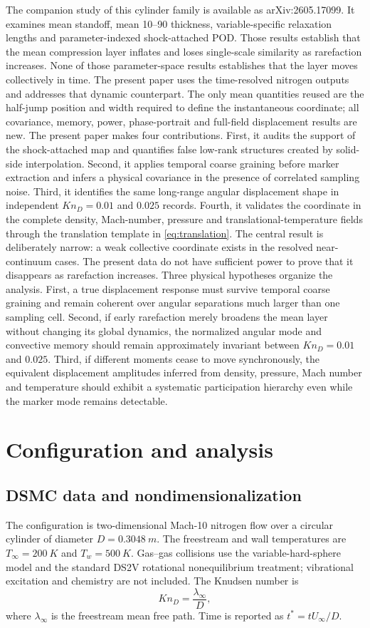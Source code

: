 \documentclass[paper]{JFM-FLM_Au}
\newcommand{\KnD}{Kn_D}
\newcommand{\tstar}{t^*}
\begin{document}
The companion study of this cylinder family \citep{RoohiShoja2026Mean} is available as arXiv:2605.17099. It examines mean standoff, mean 10--90 thickness, variable-specific relaxation lengths and parameter-indexed shock-attached POD. Those results establish that the mean compression layer inflates and loses single-scale similarity as rarefaction increases. None of those parameter-space results establishes that the layer moves collectively in time. The present paper uses the time-resolved nitrogen outputs and addresses that dynamic counterpart. The only mean quantities reused are the half-jump position and width required to define the instantaneous coordinate; all covariance, memory, power, phase-portrait and full-field displacement results are new. The present paper makes four contributions. First, it audits the support of the shock-attached map and quantifies false low-rank structures created by solid-side interpolation. Second, it applies temporal coarse graining before marker extraction and infers a physical covariance in the presence of correlated sampling noise. Third, it identifies the same long-range angular displacement shape in independent $\KnD=0.01$ and $0.025$ records. Fourth, it validates the coordinate in the complete density, Mach-number, pressure and translational-temperature fields through the translation template in \cref{eq:translation}. The central result is deliberately narrow: a weak collective coordinate exists in the resolved near-continuum cases. The present data do not have sufficient power to prove that it disappears as rarefaction increases. Three physical hypotheses organize the analysis. First, a true displacement response must survive temporal coarse graining and remain coherent over angular separations much larger than one sampling cell. Second, if early rarefaction merely broadens the mean layer without changing its global dynamics, the normalized angular mode and convective memory should remain approximately invariant between $\KnD=0.01$ and $0.025$. Third, if different moments cease to move synchronously, the equivalent displacement amplitudes inferred from density, pressure, Mach number and temperature should exhibit a systematic participation hierarchy even while the marker mode remains detectable.

\section{Configuration and analysis}
\subsection{DSMC data and nondimensionalization}
The configuration is two-dimensional Mach-10 nitrogen flow over a circular cylinder of diameter $D=\SI{0.3048}{m}$. The freestream and wall temperatures are $T_\infty=\SI{200}{K}$ and $T_w=\SI{500}{K}$. Gas--gas collisions use the variable-hard-sphere model and the standard DS2V rotational nonequilibrium treatment; vibrational excitation and chemistry are not included. The Knudsen number is
\begin{equation}
 \KnD=\frac{\lambda_\infty}{D},
\end{equation}
where $\lambda_\infty$ is the freestream mean free path. Time is reported as $\tstar=tU_\infty/D$.
\end{document}
